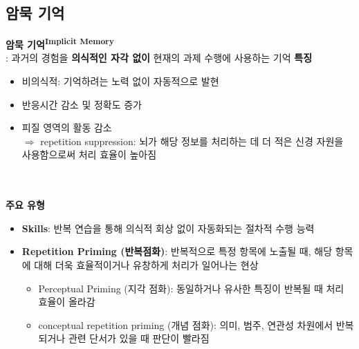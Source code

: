 \documentclass{beamer}
\begin{document}
\subsection{암묵 기억}
\begin{frame}{\textbf{암묵 기억\textsuperscript{Implicit Memory}}\\\large : 과거의 경험을 \textbf{의식적인 자각 없이} 현재의 과제 수행에 사용하는 기억}
  \textbf{특징}
  \vspace{-0.5em}
  \begin{itemize}
    \item 비의식적: 기억하려는 노력 없이 자동적으로 발현
    \item 반응시간 감소 및 정확도 증가
    \item 피질 영역의 활동 감소\\
    $\Rightarrow$ repetition suppression: 뇌가 해당 정보를 처리하는 데 더 적은 신경 자원을 사용함으로써 처리 효율이 높아짐
  \end{itemize}\\~\\
  \textbf{주요 유형}
  \vspace{-0.5em}
  \begin{itemize}
    \item \textbf{Skills}: 반복 연습을 통해 의식적 회상 없이 자동화되는 절차적 수행 능력
    \item \textbf{Repetition Priming (반복점화)}: 반복적으로 특정 항목에 노출될 때, 해당 항목에 대해 더욱 효율적이거나 유창하게  처리가 일어나는 현상
      \begin{itemize}
        \item Perceptual Priming (지각 점화): 동일하거나 유사한 특징이 반복될 때 처리 효율이 올라감
        \item conceptual repetition priming (개념 점화): 의미, 범주, 연관성 차원에서 반복되거나 관련 단서가 있을 때 판단이 빨라짐
      \end{itemize}
  \end{itemize}
\end{frame}
\end{document}
